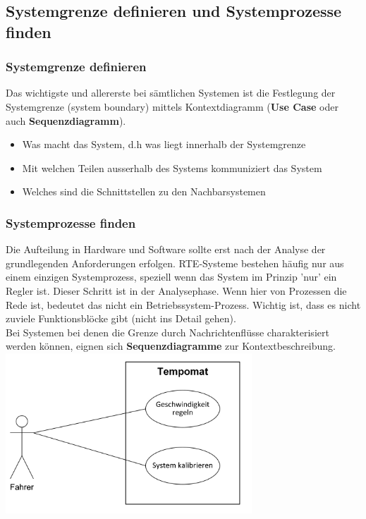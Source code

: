 \subsection{Systemgrenze definieren und Systemprozesse finden}
\subsubsection{Systemgrenze definieren}
Das wichtigste und allererste bei sämtlichen Systemen ist die Festlegung der Systemgrenze (system boundary) mittels Kontextdiagramm (\textbf{Use Case} oder auch \textbf{Sequenzdiagramm}).
\begin{itemize}
	\item Was macht das System, d.h was liegt innerhalb der Systemgrenze
	\item Mit welchen Teilen ausserhalb des Systems kommuniziert das System
	\item Welches sind die Schnittstellen zu den Nachbarsystemen
\end{itemize}

\subsubsection{Systemprozesse finden}
\begin{multicols}{2}
Die Aufteilung in Hardware und Software sollte erst nach der Analyse der grundlegenden Anforderungen erfolgen. RTE-Systeme bestehen häufig nur aus einem einzigen Systemprozess, speziell wenn das System im Prinzip 'nur' ein Regler ist. Dieser Schritt ist in der Analysephase. Wenn hier von Prozessen die Rede ist, bedeutet das nicht ein Betriebssystem-Prozess. Wichtig ist, dass es nicht zuviele Funktionsblöcke gibt (nicht ins Detail gehen). \\
Bei Systemen bei denen die Grenze durch Nachrichtenflüsse charakterisiert werden können, eignen sich \textbf{Sequenzdiagramme} zur Kontextbeschreibung.\\
\vfill\null
\columnbreak
\includegraphics[height=6cm]{images/Modellierung/Systemgrenze}
\end{multicols}

